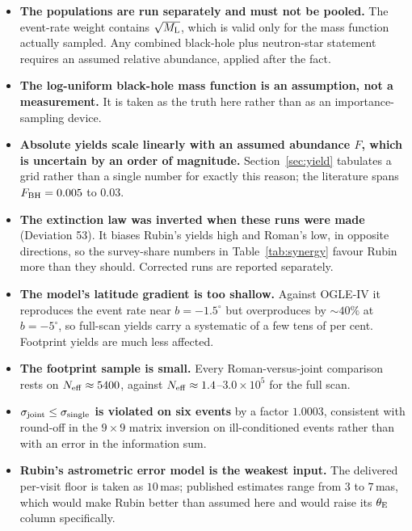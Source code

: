 \documentclass[english,10pt,a4paper]{article}
\newcommand{\tetE}{\theta_{\rm E}}
\newcommand{\Ml}{M_{\rm L}}
\newcommand{\Neff}{N_{\rm eff}}
\begin{document}
\begin{itemize}
\item \textbf{The populations are run separately and must not be pooled.} The event-rate weight
      contains $\sqrt{\Ml}$, which is valid only for the mass function actually sampled. Any
      combined black-hole plus neutron-star statement requires an assumed relative abundance,
      applied after the fact.
\item \textbf{The log-uniform black-hole mass function is an assumption, not a measurement.} It
      is taken as the truth here rather than as an importance-sampling device.
\item \textbf{Absolute yields scale linearly with an assumed abundance $F$, which is uncertain by
      an order of magnitude.} Section~\ref{sec:yield} tabulates a grid rather than a single number
      for exactly this reason; the literature spans $F_{\rm BH} = 0.005$ to $0.03$.
\item \textbf{The extinction law was inverted when these runs were made} (Deviation 53). It biases
      Rubin's yields high and Roman's low, in opposite directions, so the survey-share numbers in
      Table~\ref{tab:synergy} favour Rubin more than they should. Corrected runs are reported
      separately.
\item \textbf{The model's latitude gradient is too shallow.} Against OGLE-IV it reproduces the
      event rate near $b=-1.5^\circ$ but overproduces by $\sim\!40\%$ at $b=-5^\circ$, so
      full-scan yields carry a systematic of a few tens of per cent. Footprint yields are much
      less affected.
\item \textbf{The footprint sample is small.} Every Roman-versus-joint comparison rests on
      $\Neff \approx 5400$, against $\Neff \approx 1.4$--$3.0\times10^5$ for the full scan.
\item \textbf{$\sigma_{\rm joint} \le \sigma_{\rm single}$ is violated on six events} by a factor
      $1.0003$, consistent with round-off in the $9\times9$ matrix inversion on ill-conditioned
      events rather than with an error in the information sum.
\item \textbf{Rubin's astrometric error model is the weakest input.} The delivered per-visit
      floor is taken as $10$\,mas; published estimates range from $3$ to $7$\,mas, which would
      make Rubin better than assumed here and would raise its $\tetE$ column specifically.
\end{itemize}

%
\end{document}
